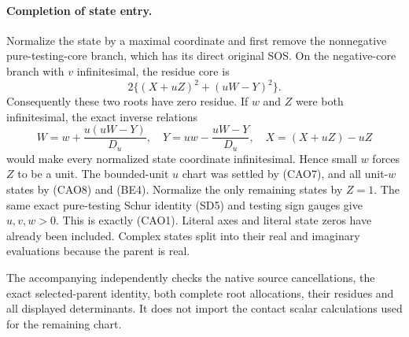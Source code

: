 \paragraph{Completion of state entry.}
Normalize the state by a maximal coordinate and first remove the
nonnegative pure-testing-core branch, which has its direct original
SOS. On the negative-core branch with $v$ infinitesimal, the residue
core is
\[
 2\{(X+uZ)^2+(uW-Y)^2\}.
\]
Consequently these two roots have zero residue. If $w$ and $Z$ were
both infinitesimal, the exact inverse relations
\[
 W=w+\frac{u(uW-Y)}{D_u},\quad
 Y=uw-\frac{uW-Y}{D_u},\quad X=(X+uZ)-uZ
\]
would make every normalized state coordinate infinitesimal. Hence
small $w$ forces $Z$ to be a unit. The bounded-unit $u$ chart was
settled by (CAO7), and all unit-$w$ states by (CAO8) and (BE4).
Normalize the only remaining states by $Z=1$. The same exact
pure-testing Schur identity (SD5) and testing sign gauges give
$u,v,w>0$. This is exactly (CAO1). Literal axes and literal state
zeros have already been included. Complex states split into their
real and imaginary evaluations because the parent is real.

The accompanying  independently
checks the native source cancellations, the exact selected-parent
identity, both complete root allocations, their residues and all
displayed determinants. It does not import the contact scalar
calculations used for the remaining chart.
